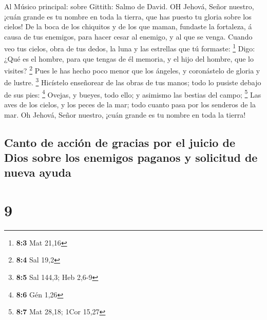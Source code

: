  Al Músico principal: sobre Gittith: Salmo de David. OH
Jehová, Señor nuestro, ¡cuán grande es tu nombre en toda la tierra, que
has puesto tu gloria sobre los cielos!  De la boca de los
chiquitos y de los que maman, fundaste la fortaleza, á causa de tus
enemigos, para hacer cesar al enemigo, y al que se venga. 
Cuando veo tus cielos, obra de tus dedos, la luna y las estrellas que tú
formaste: \footnote{\textbf{8:3} Mat 21,16}  Digo: ¿Qué es
el hombre, para que tengas de él memoria, y el hijo del hombre, que lo
visites? \footnote{\textbf{8:4} Sal 19,2}  Pues le has hecho
poco menor que los ángeles, y coronástelo de gloria y de lustre.
\footnote{\textbf{8:5} Sal 144,3; Heb 2,6-9}  Hicístelo
enseñorear de las obras de tus manos; todo lo pusiste debajo de sus
pies: \footnote{\textbf{8:6} Gén 1,26}  Ovejas, y bueyes,
todo ello; y asimismo las bestias del campo; \footnote{\textbf{8:7} Mat
  28,18; 1Cor 15,27}  Las aves de los cielos, y los peces de
la mar; todo cuanto pasa por los senderos de la mar.  Oh
Jehová, Señor nuestro, ¡cuán grande es tu nombre en toda la tierra!

\hypertarget{canto-de-acciuxf3n-de-gracias-por-el-juicio-de-dios-sobre-los-enemigos-paganos-y-solicitud-de-nueva-ayuda}{%
\subsection{Canto de acción de gracias por el juicio de Dios sobre los
enemigos paganos y solicitud de nueva
ayuda}\label{canto-de-acciuxf3n-de-gracias-por-el-juicio-de-dios-sobre-los-enemigos-paganos-y-solicitud-de-nueva-ayuda}}

\hypertarget{section-8}{%
\section{9}\label{section-8}}

